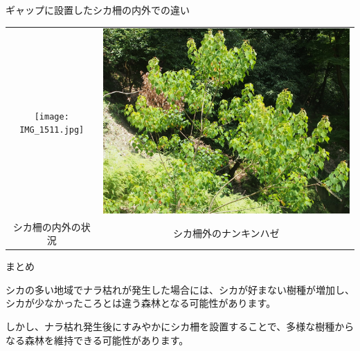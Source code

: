 \documentclass[unicode]{beamer}
\begin{document}
\begin{frame}
\begin{columns}[t]
\begin{column}{.49\linewidth}
\begin{block}{ギャップに設置したシカ柵の内外での違い}
{\centering
\vspace{3cm}
\begin{tabular}{cc}
\texttt{[image: IMG\_1511.jpg]} &
\includegraphics[width=20cm]{photo-4.jpg} \\
{\small シカ柵の内外の状況} &
{\small シカ柵外のナンキンハゼ}
\end{tabular}
}
\end{block}

\begin{block}{まとめ}

シカの多い地域でナラ枯れが発生した場合には、シカが好まない樹種が増加し、シカが少なかったころとは違う森林となる可能性があります。

\vspace{2cm}

しかし、ナラ枯れ発生後にすみやかにシカ柵を設置することで、多様な樹種からなる森林を維持できる可能性があります。

\vspace{2.4cm}

\end{block}

\end{column}
\end{columns}
\end{frame}
\end{document}
